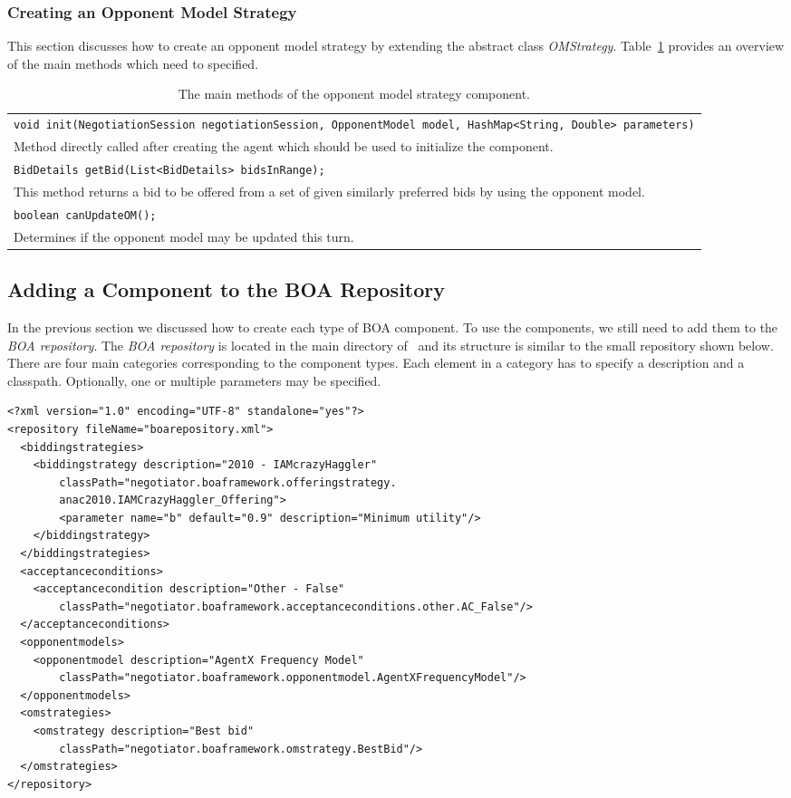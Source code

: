 \documentclass[]{article}
\begin{document}
\subsubsection{Creating an Opponent Model Strategy}
This section discusses how to create an opponent model strategy by extending the abstract class \textit{OMStrategy}. Table~\ref{tab:BOAoms} provides an overview of the main methods which need to specified.

\begin{table}[h]
\begin{tabular}{m{}}
\hline
\texttt{void init(NegotiationSession negotiationSession, OpponentModel model, HashMap<String, Double> parameters)}\\
Method directly called after creating the agent which should be used to initialize the component.\\
\hline
\texttt{BidDetails getBid(List<BidDetails> bidsInRange);}\\
This method returns a bid to be offered from a set of given similarly preferred bids by using the opponent model.\\
\hline
\texttt{boolean canUpdateOM();}\\
Determines if the opponent model may be updated this turn.\\
\hline
\end{tabular}
\caption{The main methods of the opponent model strategy component.}
\label{tab:BOAoms}
\end{table}

\subsection{Adding a Component to the BOA Repository}
In the previous section we discussed how to create each type of BOA component. To use the components, we still need to add them to the \textit{BOA repository}. The \textit{BOA repository} is located in the main directory of \Genius ~and its structure is similar to the small repository shown below. There are four main categories corresponding to the component types. Each element in a category has to specify a description and a classpath. Optionally, one or multiple parameters may be specified.

\begin{lstlisting}
<?xml version="1.0" encoding="UTF-8" standalone="yes"?>
<repository fileName="boarepository.xml">
  <biddingstrategies>
    <biddingstrategy description="2010 - IAMcrazyHaggler"
		classPath="negotiator.boaframework.offeringstrategy.
		anac2010.IAMCrazyHaggler_Offering">
		<parameter name="b" default="0.9" description="Minimum utility"/>
    </biddingstrategy>
  </biddingstrategies>
  <acceptanceconditions>
    <acceptancecondition description="Other - False"
		classPath="negotiator.boaframework.acceptanceconditions.other.AC_False"/>
  </acceptanceconditions>
  <opponentmodels>
    <opponentmodel description="AgentX Frequency Model"
		classPath="negotiator.boaframework.opponentmodel.AgentXFrequencyModel"/>
  </opponentmodels>
  <omstrategies>
    <omstrategy description="Best bid"
		classPath="negotiator.boaframework.omstrategy.BestBid"/>
  </omstrategies>
</repository>
\end{lstlisting}
\end{document}
